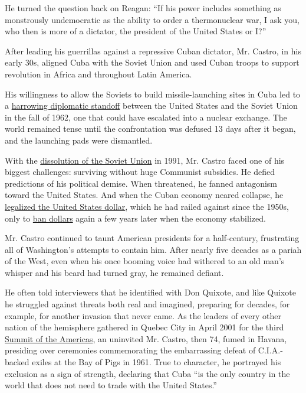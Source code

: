He turned the question back on Reagan: ``If his power includes something
as monstrously undemocratic as the ability to order a thermonuclear war,
I ask you, who then is more of a dictator, the president of the United
States or I?''

After leading his guerrillas against a repressive Cuban dictator, Mr.
Castro, in his early 30s, aligned Cuba with the Soviet Union and used
Cuban troops to support revolution in Africa and throughout Latin
America.

His willingness to allow the Soviets to build missile-launching sites in
Cuba led to a
\href{http://topics.nytimes3xbfgragh.onion/top/reference/timestopics/subjects/c/cuban_missile_crisis/index.html}{harrowing
diplomatic standoff} between the United States and the Soviet Union in
the fall of 1962, one that could have escalated into a nuclear exchange.
The world remained tense until the confrontation was defused 13 days
after it began, and the launching pads were dismantled.

With the
\href{http://www.nytimes3xbfgragh.onion/1991/09/06/world/soviet-turmoil-soviet-congress-yields-rule-republics-avoid-political-economic.html}{dissolution
of the Soviet Union} in 1991, Mr. Castro faced one of his biggest
challenges: surviving without huge Communist subsidies. He defied
predictions of his political demise. When threatened, he fanned
antagonism toward the United States. And when the Cuban economy neared
collapse, he
\href{http://www.nytimes3xbfgragh.onion/1994/08/28/world/flight-from-cuba-in-havana-dollars-define-cuba-s-haves-and-have-nots.html}{legalized
the United States dollar}, which he had railed against since the 1950s,
only to
\href{http://www.nytimes3xbfgragh.onion/2004/11/28/international/americas/28cuba.html}{ban
dollars} again a few years later when the economy stabilized.

Mr. Castro continued to taunt American presidents for a half-century,
frustrating all of Washington's attempts to contain him. After nearly
five decades as a pariah of the West, even when his once booming voice
had withered to an old man's whisper and his beard had turned gray, he
remained defiant.

He often told interviewers that he identified with Don Quixote, and like
Quixote he struggled against threats both real and imagined, preparing
for decades, for example, for another invasion that never came. As the
leaders of every other nation of the hemisphere gathered in Quebec City
in April 2001 for the third
\href{http://www.nytimes3xbfgragh.onion/2001/04/23/world/talks-tie-trade-in-the-americas-to-democracy.html}{Summit
of the Americas}, an uninvited Mr. Castro, then 74, fumed in Havana,
presiding over ceremonies commemorating the embarrassing defeat of
C.I.A.-backed exiles at the Bay of Pigs in 1961. True to character, he
portrayed his exclusion as a sign of strength, declaring that Cuba ``is
the only country in the world that does not need to trade with the
United States.''

